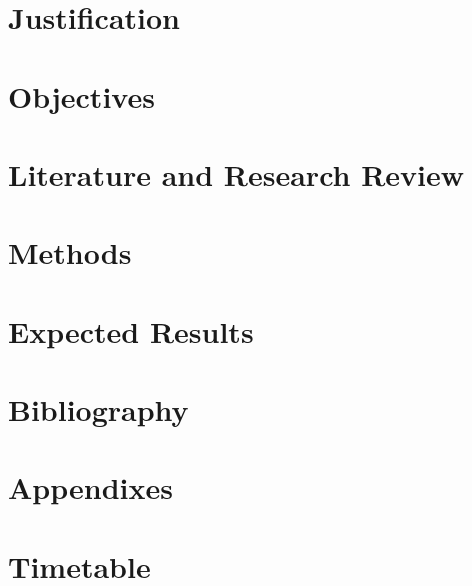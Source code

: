 \documentclass[a4,useAMS,usenatbib,usegraphicx,11pt]{article}
\begin{document}
\section{Justification}


\section{Objectives}


\section{Literature and Research Review}


\section{Methods}


\section{Expected Results}


\section{Bibliography}




\section{Appendixes}


\section{Timetable}
\end{document}
